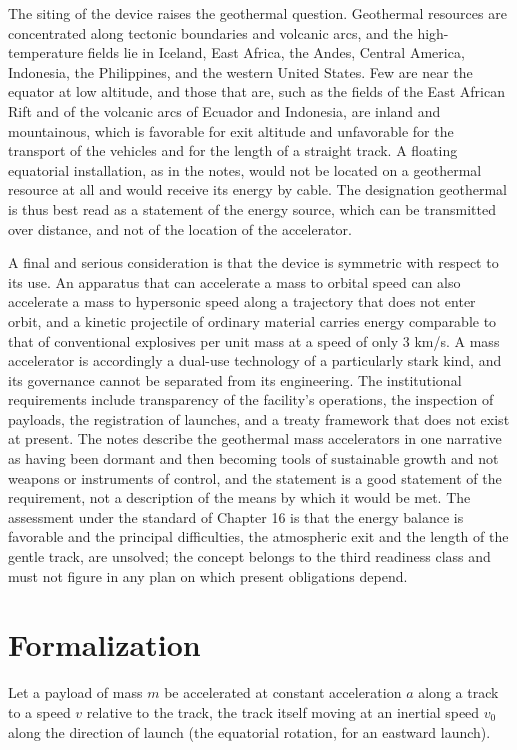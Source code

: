 The siting of the device raises the geothermal question. Geothermal resources are concentrated along tectonic boundaries and volcanic arcs, and the high-temperature fields lie in Iceland, East Africa, the Andes, Central America, Indonesia, the Philippines, and the western United States. Few are near the equator at low altitude, and those that are, such as the fields of the East African Rift and of the volcanic arcs of Ecuador and Indonesia, are inland and mountainous, which is favorable for exit altitude and unfavorable for the transport of the vehicles and for the length of a straight track. A floating equatorial installation, as in the notes, would not be located on a geothermal resource at all and would receive its energy by cable. The designation geothermal is thus best read as a statement of the energy source, which can be transmitted over distance, and not of the location of the accelerator.

A final and serious consideration is that the device is symmetric with respect to its use. An apparatus that can accelerate a mass to orbital speed can also accelerate a mass to hypersonic speed along a trajectory that does not enter orbit, and a kinetic projectile of ordinary material carries energy comparable to that of conventional explosives per unit mass at a speed of only $3$ km/s. A mass accelerator is accordingly a dual-use technology of a particularly stark kind, and its governance cannot be separated from its engineering. The institutional requirements include transparency of the facility's operations, the inspection of payloads, the registration of launches, and a treaty framework that does not exist at present. The notes describe the geothermal mass accelerators in one narrative as having been dormant and then becoming tools of sustainable growth and not weapons or instruments of control, and the statement is a good statement of the requirement, not a description of the means by which it would be met. The assessment under the standard of Chapter 16 is that the energy balance is favorable and the principal difficulties, the atmospheric exit and the length of the gentle track, are unsolved; the concept belongs to the third readiness class and must not figure in any plan on which present obligations depend.

\section*{Formalization}

Let a payload of mass $m$ be accelerated at constant acceleration $a$ along a track to a speed $v$ relative to the track, the track itself moving at an inertial speed $v_0$ along the direction of launch (the equatorial rotation, for an eastward launch).

